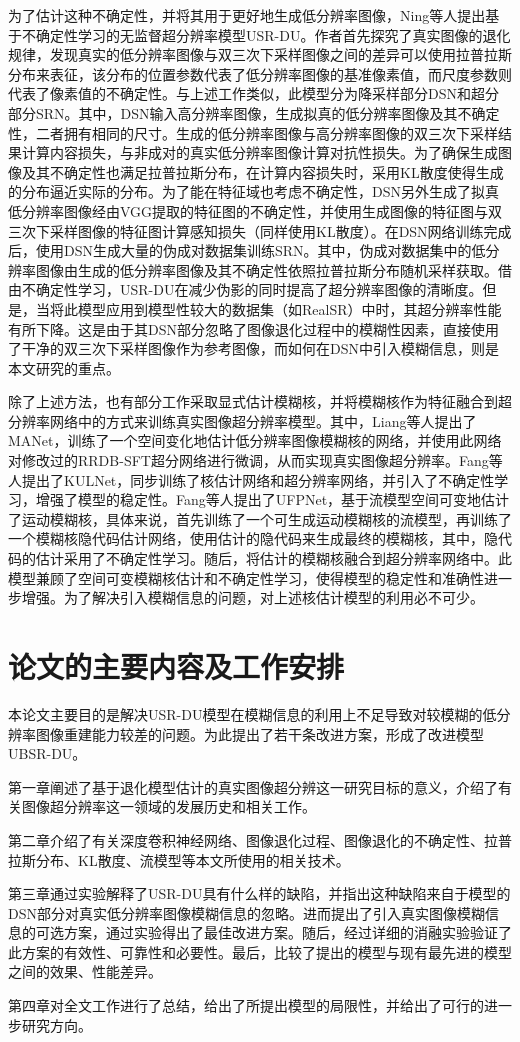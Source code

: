 为了估计这种不确定性，并将其用于更好地生成低分辨率图像，Ning等人提出基于不确定性学习的无监督超分辨率模型USR-DU。作者首先探究了真实图像的退化规律，发现真实的低分辨率图像与双三次下采样图像之间的差异可以使用拉普拉斯分布来表征，该分布的位置参数代表了低分辨率图像的基准像素值，而尺度参数则代表了像素值的不确定性。与上述工作类似，此模型分为降采样部分DSN和超分部分SRN。其中，DSN输入高分辨率图像，生成拟真的低分辨率图像及其不确定性，二者拥有相同的尺寸。生成的低分辨率图像与高分辨率图像的双三次下采样结果计算内容损失，与非成对的真实低分辨率图像计算对抗性损失。为了确保生成图像及其不确定性也满足拉普拉斯分布，在计算内容损失时，采用KL散度使得生成的分布逼近实际的分布。为了能在特征域也考虑不确定性，DSN另外生成了拟真低分辨率图像经由VGG提取的特征图的不确定性，并使用生成图像的特征图与双三次下采样图像的特征图计算感知损失（同样使用KL散度）。在DSN网络训练完成后，使用DSN生成大量的伪成对数据集训练SRN。其中，伪成对数据集中的低分辨率图像由生成的低分辨率图像及其不确定性依照拉普拉斯分布随机采样获取。借由不确定性学习，USR-DU在减少伪影的同时提高了超分辨率图像的清晰度。但是，当将此模型应用到模型性较大的数据集（如RealSR）中时，其超分辨率性能有所下降。这是由于其DSN部分忽略了图像退化过程中的模糊性因素，直接使用了干净的双三次下采样图像作为参考图像，而如何在DSN中引入模糊信息，则是本文研究的重点。

除了上述方法，也有部分工作采取显式估计模糊核，并将模糊核作为特征融合到超分辨率网络中的方式来训练真实图像超分辨率模型。其中，Liang等人提出了MANet，训练了一个空间变化地估计低分辨率图像模糊核的网络，并使用此网络对修改过的RRDB-SFT超分网络进行微调，从而实现真实图像超分辨率。Fang等人提出了KULNet，同步训练了核估计网络和超分辨率网络，并引入了不确定性学习，增强了模型的稳定性。Fang等人提出了UFPNet，基于流模型空间可变地估计了运动模糊核，具体来说，首先训练了一个可生成运动模糊核的流模型，再训练了一个模糊核隐代码估计网络，使用估计的隐代码来生成最终的模糊核，其中，隐代码的估计采用了不确定性学习。随后，将估计的模糊核融合到超分辨率网络中。此模型兼顾了空间可变模糊核估计和不确定性学习，使得模型的稳定性和准确性进一步增强。为了解决引入模糊信息的问题，对上述核估计模型的利用必不可少。

\section{论文的主要内容及工作安排}
本论文主要目的是解决USR-DU模型在模糊信息的利用上不足导致对较模糊的低分辨率图像重建能力较差的问题。为此提出了若干条改进方案，形成了改进模型UBSR-DU。

第一章阐述了基于退化模型估计的真实图像超分辨这一研究目标的意义，介绍了有关图像超分辨率这一领域的发展历史和相关工作。

第二章介绍了有关深度卷积神经网络、图像退化过程、图像退化的不确定性、拉普拉斯分布、KL散度、流模型等本文所使用的相关技术。

第三章通过实验解释了USR-DU具有什么样的缺陷，并指出这种缺陷来自于模型的DSN部分对真实低分辨率图像模糊信息的忽略。进而提出了引入真实图像模糊信息的可选方案，通过实验得出了最佳改进方案。随后，经过详细的消融实验验证了此方案的有效性、可靠性和必要性。最后，比较了提出的模型与现有最先进的模型之间的效果、性能差异。

第四章对全文工作进行了总结，给出了所提出模型的局限性，并给出了可行的进一步研究方向。